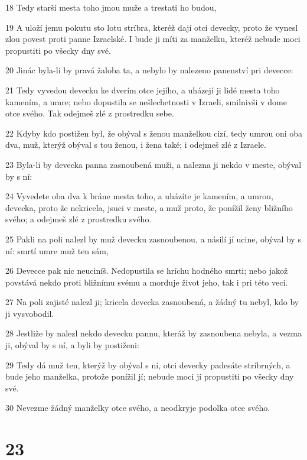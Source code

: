 \par 18 Tedy starší mesta toho jmou muže a trestati ho budou,
\par 19 A uloží jemu pokutu sto lotu stríbra, kteréž dají otci devecky, proto že vynesl zlou povest proti panne Izraelské. I bude ji míti za manželku, kteréž nebude moci propustiti po všecky dny své.
\par 20 Jinác byla-li by pravá žaloba ta, a nebylo by nalezeno panenství pri devecce:
\par 21 Tedy vyvedou devecku ke dverím otce jejího, a uházejí ji lidé mesta toho kamením, a umre; nebo dopustila se nešlechetnosti v Izraeli, smilnivši v dome otce svého. Tak odejmeš zlé z prostredku sebe.
\par 22 Kdyby kdo postižen byl, že obýval s ženou manželkou cizí, tedy umrou oni oba dva, muž, kterýž obýval s tou ženou, i žena také; i odejmeš zlé z Izraele.
\par 23 Byla-li by devecka panna zasnoubená muži, a nalezna ji nekdo v meste, obýval by s ní:
\par 24 Vyvedete oba dva k bráne mesta toho, a uházíte je kamením, a umrou, devecka, proto že nekricela, jsuci v meste, a muž proto, že ponížil ženy bližního svého; a odejmeš zlé z prostredku svého.
\par 25 Pakli na poli nalezl by muž devecku zasnoubenou, a násilí jí ucine, obýval by s ní: smrtí umre muž ten sám,
\par 26 Devecce pak nic neuciníš. Nedopustila se hríchu hodného smrti; nebo jakož povstává nekdo proti bližnímu svému a morduje život jeho, tak i pri této veci.
\par 27 Na poli zajisté nalezl ji; kricela devecka zasnoubená, a žádný tu nebyl, kdo by ji vysvobodil.
\par 28 Jestliže by nalezl nekdo devecku pannu, kteráž by zasnoubena nebyla, a vezma ji, obýval by s ní, a byli by postiženi:
\par 29 Tedy dá muž ten, kterýž by obýval s ní, otci devecky padesáte stríbrných, a bude jeho manželka, protože ponížil jí; nebude moci jí propustiti po všecky dny své.
\par 30 Nevezme žádný manželky otce svého, a neodkryje podolka otce svého.

\chapter{23}

